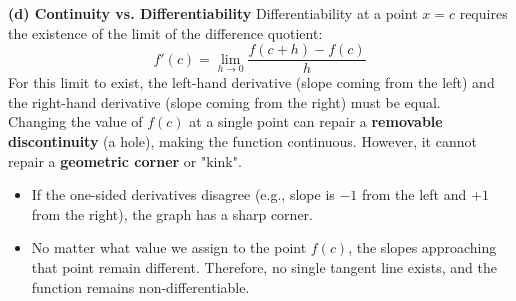 \textbf{(d) Continuity vs. Differentiability}
Differentiability at a point $x=c$ requires the existence of the limit of the difference quotient:
\[ f'(c) = \lim_{h \to 0} \frac{f(c+h) - f(c)}{h} \]
For this limit to exist, the left-hand derivative (slope coming from the left) and the right-hand derivative (slope coming from the right) must be equal. \\
Changing the value of $f(c)$ at a single point can repair a \textbf{removable discontinuity} (a hole), making the function continuous. However, it cannot repair a \textbf{geometric corner} or "kink".
\begin{itemize}
    \item If the one-sided derivatives disagree (e.g., slope is $-1$ from the left and $+1$ from the right), the graph has a sharp corner.
    \item No matter what value we assign to the point $f(c)$, the slopes approaching that point remain different. Therefore, no single tangent line exists, and the function remains non-differentiable.
\end{itemize}

\begin{center}
\hfill
{}
\end{center}

\pagebreak

